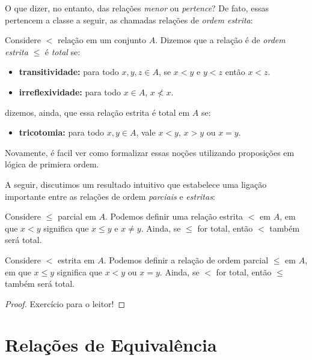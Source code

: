 O que dizer, no entanto, das relações \textit{menor} ou \textit{pertence}? De fato, essas pertencem a classe a seguir, as chamadas relações de \textit{ordem estrita}:

\begin{definition}
    \label{estrict_order}
    Considere $<$ relação em um conjunto $A$. Dizemos que a relação é de \textit{ordem estrita} $\leq$ é \textit{total} se:

    \begin{itemize}
        \item \textbf{transitividade: } para todo $x,y,z \in A$, se $x<y$ e $y<z$ então $x<z$.
        \item \textbf{irreflexividade: } para todo $x\in A$, $x\nless x$.
    \end{itemize}
    dizemos, ainda, que essa relação estrita é total em $A$ se:
    \begin{itemize}
        \item \textbf{tricotomia:} para todo $x,y \in A$, vale $x<y$, $x>y$ ou $x=y$.
    \end{itemize}
\end{definition}

\noindent Novamente, é facil ver como formalizar essas noções utilizando proposições em lógica de primiera ordem.


A seguir, discutimos um resultado intuitivo que estabelece uma ligação importante entre as relações de ordem \textit{parciais} e \textit{estritas}:

\begin{theorem}
    \label{estrict_by_partial}
    Considere $\leq$ parcial em $A$. Podemos definir uma relação estrita $<$ em $A$, em que $x<y$ significa que $x\leq y$ e $x \neq y$. Ainda, se $\leq $ for total, então $<$ também será total.
\end{theorem}
\begin{theorem}
    \label{partial_by_estrict}
    Considere $<$ estrita em $A$. Podemos definir a relação de ordem parcial $\leq $ em $A$, em que $x\leq y$ significa que $x < y$ ou $x = y$. Ainda, se $<$ for total, então $\leq$ também será total.
\end{theorem}

\begin{proof}
    Exercício para o leitor!
\end{proof}

\section{Relações de Equivalência}


